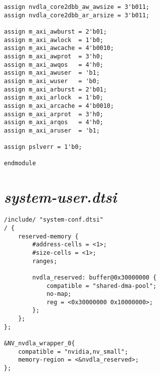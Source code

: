 \begin{lstlisting}
assign nvdla_core2dbb_aw_awsize = 3'b011;
assign nvdla_core2dbb_ar_arsize = 3'b011;

assign m_axi_awburst = 2'b01;
assign m_axi_awlock  = 1'b0;
assign m_axi_awcache = 4'b0010;
assign m_axi_awprot  = 3'h0;
assign m_axi_awqos   = 4'h0;
assign m_axi_awuser  = 'b1;
assign m_axi_wuser   = 'b0;
assign m_axi_arburst = 2'b01;
assign m_axi_arlock  = 1'b0;
assign m_axi_arcache = 4'b0010;
assign m_axi_arprot  = 3'h0;
assign m_axi_arqos   = 4'h0;
assign m_axi_aruser  = 'b1;

assign pslverr = 1'b0;

endmodule
\end{lstlisting}

\section{\emph{system-user.dtsi}}

\begin{lstlisting}
/include/ "system-conf.dtsi"
/ {
    reserved-memory {
        #address-cells = <1>;
        #size-cells = <1>;
        ranges;
    
        nvdla_reserved: buffer@0x30000000 {
            compatible = "shared-dma-pool";
            no-map;
            reg = <0x30000000 0x10000000>;
        };
    };
};

&NV_nvdla_wrapper_0{
    compatible = "nvidia,nv_small";
    memory-region = <&nvdla_reserved>;
};
\end{lstlisting}


